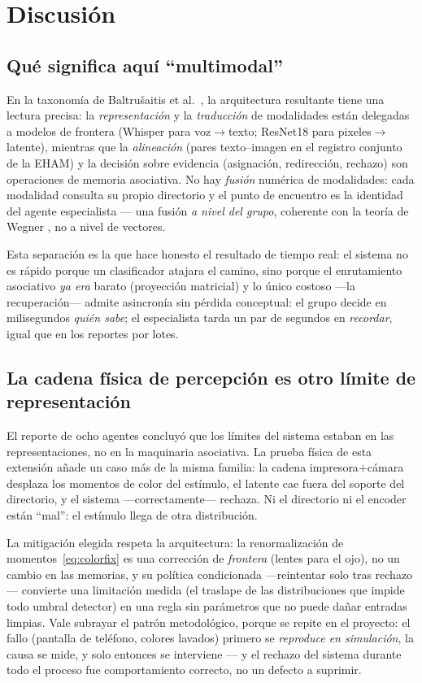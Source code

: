 \section{Discusión}
\label{sec:discusion}

\subsection{Qué significa aquí ``multimodal''}

En la taxonomía de Baltru\v{s}aitis et al.\ \cite{baltrusaitis2019multimodal}, la
arquitectura resultante tiene una lectura precisa: la \emph{representación} y la
\emph{traducción} de modalidades están delegadas a modelos de frontera (Whisper para
voz$\to$texto; ResNet18 para pixeles$\to$latente), mientras que la \emph{alineación}
(pares texto--imagen en el registro conjunto de la EHAM) y la decisión sobre evidencia
(asignación, redirección, rechazo) son operaciones de memoria asociativa.
No hay \emph{fusión} numérica de modalidades: cada modalidad consulta su propio
directorio y el punto de encuentro es la identidad del agente especialista --- una
fusión \emph{a nivel del grupo}, coherente con la teoría de Wegner
\cite{wegner1987transactive}, no a nivel de vectores.

Esta separación es la que hace honesto el resultado de tiempo real: el sistema no es
rápido porque un clasificador atajara el camino, sino porque el enrutamiento
asociativo \emph{ya era} barato (proyección matricial) y lo único costoso ---la
recuperación--- admite asincronía sin pérdida conceptual: el grupo decide en
milisegundos \emph{quién sabe}; el especialista tarda un par de segundos en
\emph{recordar}, igual que en los reportes por lotes.

\subsection{La cadena física de percepción es otro límite de representación}

El reporte de ocho agentes concluyó que los límites del sistema estaban en las
representaciones, no en la maquinaria asociativa.
La prueba física de esta extensión añade un caso más de la misma familia: la cadena
impresora$+$cámara desplaza los momentos de color del estímulo, el latente cae fuera
del soporte del directorio, y el sistema ---correctamente--- rechaza.
Ni el directorio ni el encoder están ``mal'': el estímulo llega de otra distribución.

La mitigación elegida respeta la arquitectura: la renormalización de
momentos~\eqref{eq:colorfix} es una corrección de \emph{frontera} (lentes para el
ojo), no un cambio en las memorias, y su política condicionada ---reintentar solo tras
rechazo--- convierte una limitación medida (el traslape de las distribuciones que
impide todo umbral detector) en una regla sin parámetros que no puede dañar entradas
limpias.
Vale subrayar el patrón metodológico, porque se repite en el proyecto: el fallo
(pantalla de teléfono, colores lavados) primero se \emph{reproduce en simulación}, la
causa se mide, y solo entonces se interviene --- y el rechazo del sistema durante todo
el proceso fue comportamiento correcto, no un defecto a suprimir.


